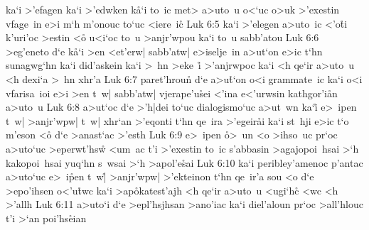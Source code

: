 ka`i
>'efagen
ka`i
>'edwken
k\r{a}`i
to~ic
met>
a>uto~u
o<`uc
o>uk
>'exestin
vfage~in
e>i
m`h
m'onouc
to`uc
<iere~i\r{c}\bibvsend
{}
\vs Luk 6:5
ka`i
>'elegen
a>uto~ic
<'o\r{t}i
k'uri'oc
>estin
<o\r{}
u<i`oc
to~u
>anjr'wpou
ka`i
to~u
sabb'atou\bibvsend
\vs Luk 6:6
>eg'eneto
d`e
k\r{a}`i
>en
<et'erw|
sabb'atw|
e>iselje~in
a>ut`on
e>ic
t`hn
sunagwg`hn
ka`i
did'askein
ka`i
>~hn
>eke~i\r{}
>'anjrwpoc
ka`i
<h
qe`ir
a>uto~u
<h
dexi`a
>~hn
xhr'a\bibvsend
\vs Luk 6:7
paret'hrou\r{n}
d`e
a>u\r{t}`on
o<i
grammate~ic
ka`i
o<i
vfarisa~ioi
e>i
>en
t~w|
sabb'atw|
vjerape'u\r{s}ei
<'ina
e<'urwsin
kathgor'i\r{a}n
a>uto~u\bibvsend
\vs Luk 6:8
a>ut`oc
d`e
>'h|dei
to`uc
dialogismo`uc
a>ut~wn
ka`i\r{}
e>~ipen
t~w|
>anjr'wpw|
t~w|
xhr`an
>'eqonti
t`hn
qe~ira
>'egeir\r{a}i
ka`i
st~hji
e>ic
t`o
m'eson
<o\r{}
d`e
>anast`ac
>'esth\bibvsend
\vs Luk 6:9
e>~ipen
\r{o}>~un
<o
>ihso~uc
pr`oc
a>uto`uc
>eperwt'hsw\r{}
<um~ac
t'i
>'exestin
to~ic
s'abbasin
>agajopoi~hsai
>`h
kakopoi~hsai
yuq`hn
s~wsai
>`h
>apol'e\r{s}ai\bibvsend
{}
\vs Luk 6:10
ka`i
peribley'amenoc
p'antac
a>uto`uc
e>~i\r{p}en
t~w|\r{}
>anjr'wpw|
>'ekteinon
t`hn
qe~ir'a
sou
<o
d`e
>epo'ihsen
o<'u\r{t}wc
ka`i
>ap\r{o}katest'ajh
<h
qe`ir
a>uto~u
<ugi`hc\r{}
<wc
<h
>'allh\bibvsend
\vs Luk 6:11
a>uto`i
d`e
>epl'hsjhsan
>ano'iac
ka`i
diel'aloun
pr`oc
>all'hlouc
t'i
>`an
poi'hs\r{e}ian
